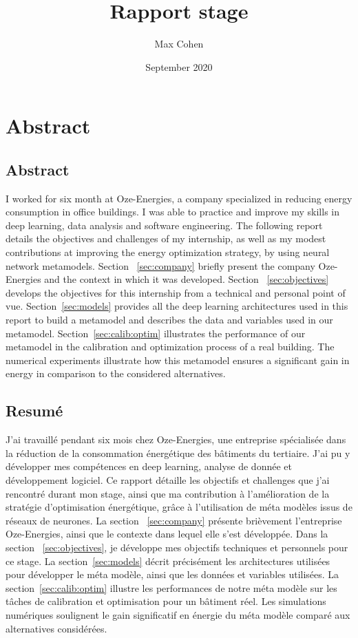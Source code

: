 \documentclass[12pt]{article}
\title{Rapport stage}
\author{Max Cohen}
\date{September 2020}
\begin{document}
\begin{titlepage}
    \maketitle
\end{titlepage}

\tableofcontents

\section{Abstract}
\subsection{Abstract}
I worked for six month at Oze-Energies, a company specialized in reducing energy consumption in office buildings. I  was  able  to  practice  and  improve  my skills in deep learning, data analysis and software engineering. The following report details the objectives and challenges of my internship, as well as my modest contributions at improving the energy optimization strategy, by using neural network metamodels. Section ~\ref{sec:company} briefly present the company Oze-Energies and the context in which it was developed. Section ~\ref{sec:objectives} develops the objectives for this internship from a technical and personal point of vue. Section~\ref{sec:models} provides all the deep learning architectures used in this report to build a metamodel and describes the data and variables used in our metamodel. Section~\ref{sec:calib:optim} illustrates the performance of our metamodel in the calibration and optimization process of a real building. The numerical experiments illustrate how this metamodel ensures a significant gain in energy in comparison to the considered alternatives.

\subsection{Resumé}
J'ai travaillé pendant six mois chez Oze-Energies, une entreprise spécialisée dans la réduction de la consommation énergétique des bâtiments du tertiaire. J'ai pu y développer mes compétences en deep learning, analyse de donnée et développement logiciel. Ce rapport détaille les objectifs et challenges que j'ai rencontré durant mon stage, ainsi que ma contribution à l'amélioration de la stratégie d'optimisation énergétique, grâce à l'utilisation de méta modèles issus de réseaux de neurones. La section ~\ref{sec:company} présente brièvement l'entreprise Oze-Energies, ainsi que le contexte dans lequel elle s'est développée. Dans la section ~\ref{sec:objectives}, je développe mes objectifs techniques et personnels pour ce stage. La section~\ref{sec:models} décrit précisément les architectures utilisées pour développer le méta modèle, ainsi que les données et variables utilisées. La section~\ref{sec:calib:optim} illustre les performances de notre méta modèle sur les tâches de calibration et optimisation pour un bâtiment réel. Les simulations numériques soulignent le gain significatif en énergie du méta modèle comparé aux alternatives considérées.
\end{document}
